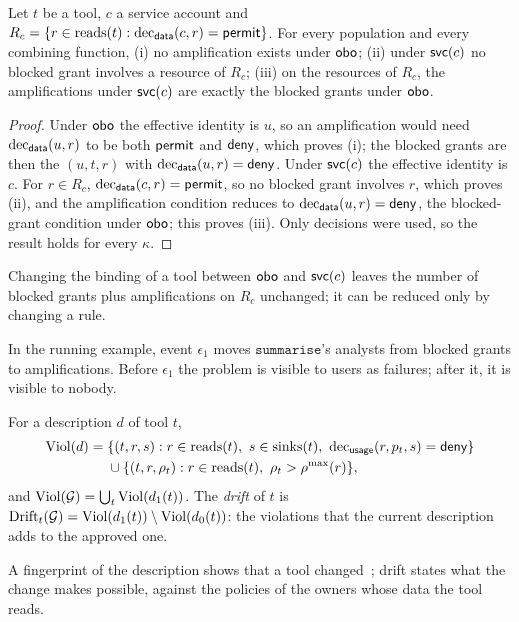 \begin{theorem}\label{thm:duality}
Let $t$ be a tool, $c$ a service account and $R_c = \{r \in \mathrm{reads}(t) : \mathrm{dec}_{\mathsf{data}}(c, r) = \mathsf{permit}\}$. For every population and every combining function, (i) no amplification exists under $\mathsf{obo}$; (ii) under $\mathsf{svc}(c)$ no blocked grant involves a resource of $R_c$; (iii) on the resources of $R_c$, the amplifications under $\mathsf{svc}(c)$ are exactly the blocked grants under $\mathsf{obo}$.
\end{theorem}
\begin{proof}
Under $\mathsf{obo}$ the effective identity is $u$, so an amplification would need $\mathrm{dec}_{\mathsf{data}}(u, r)$ to be both $\mathsf{permit}$ and $\mathsf{deny}$, which proves (i); the blocked grants are then the $(u, t, r)$ with $\mathrm{dec}_{\mathsf{data}}(u, r) = \mathsf{deny}$. Under $\mathsf{svc}(c)$ the effective identity is $c$. For $r \in R_c$, $\mathrm{dec}_{\mathsf{data}}(c, r) = \mathsf{permit}$, so no blocked grant involves $r$, which proves (ii), and the amplification condition reduces to $\mathrm{dec}_{\mathsf{data}}(u, r) = \mathsf{deny}$, the blocked-grant condition under $\mathsf{obo}$; this proves (iii). Only decisions were used, so the result holds for every $\kappa$.
\end{proof}
\begin{corollary}\label{cor:invariant}
Changing the binding of a tool between $\mathsf{obo}$ and $\mathsf{svc}(c)$ leaves the number of blocked grants plus amplifications on $R_c$ unchanged; it can be reduced only by changing a rule.
\end{corollary}
In the running example, event $\epsilon_1$ moves $\texttt{summarise}$'s analysts from blocked grants to amplifications. Before $\epsilon_1$ the problem is visible to users as failures; after it, it is visible to nobody.

\begin{definition}\label{def:usage}
For a description $d$ of tool $t$,
\begin{align*}
\Viol(d) ={}& \{(t, r, s) : r \in \reads(t),\ s \in \sinks(t),\ \dec_{\mathsf{usage}}(r, p_t, s) = \deny\}\\
&\cup \{(t, r, \rho_t) : r \in \reads(t),\ \rho_t > \rho^{\max}(r)\},
\end{align*}
and $\mathrm{Viol}(\mathcal{G}) = \bigcup_t \mathrm{Viol}(d_1(t))$. The \emph{drift} of $t$ is $\mathrm{Drift}_t(\mathcal{G}) = \mathrm{Viol}(d_1(t)) \setminus \mathrm{Viol}(d_0(t))$: the violations that the current description adds to the approved one.
\end{definition}
A fingerprint of the description shows that a tool changed~\cite{bharti2026drift}; drift states what the change makes possible, against the policies of the owners whose data the tool reads.

